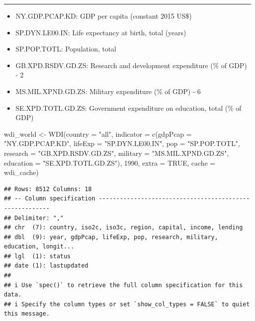 \documentclass[
]{article}
\newenvironment{Shaded}{\begin{snugshade}}{\end{snugshade}}
\newcommand{\AttributeTok}[1]{\textcolor[rgb]{0.77,0.63,0.00}{#1}}
\newcommand{\ConstantTok}[1]{\textcolor[rgb]{0.00,0.00,0.00}{#1}}
\newcommand{\DecValTok}[1]{\textcolor[rgb]{0.00,0.00,0.81}{#1}}
\newcommand{\FunctionTok}[1]{\textcolor[rgb]{0.00,0.00,0.00}{#1}}
\newcommand{\NormalTok}[1]{#1}
\newcommand{\OtherTok}[1]{\textcolor[rgb]{0.56,0.35,0.01}{#1}}
\newcommand{\StringTok}[1]{\textcolor[rgb]{0.31,0.60,0.02}{#1}}
\begin{document}
\begin{center}\rule{0.5\linewidth}{0.5pt}\end{center}

\begin{itemize}
\item
  NY.GDP.PCAP.KD: GDP per capita (constant 2015 US\$)
\item
  SP.DYN.LE00.IN: Life expectancy at birth, total (years)
\item
  SP.POP.TOTL: Population, total
\item
  GB.XPD.RSDV.GD.ZS: Research and development expenditure (\% of GDP) -
  2
\item
  MS.MIL.XPND.GD.ZS: Military expenditure (\% of GDP) - 6
\item
  SE.XPD.TOTL.GD.ZS: Government expenditure on education, total (\% of
  GDP)
\end{itemize}

\begin{Shaded}
\begin{Highlighting}[]
\NormalTok{wdi\_world }\OtherTok{\textless{}{-}} \FunctionTok{WDI}\NormalTok{(}\AttributeTok{country =} \StringTok{"all"}\NormalTok{, }\AttributeTok{indicator =} \FunctionTok{c}\NormalTok{(}\AttributeTok{gdpPcap =} \StringTok{"NY.GDP.PCAP.KD"}\NormalTok{, }\AttributeTok{lifeExp =} \StringTok{"SP.DYN.LE00.IN"}\NormalTok{, }\AttributeTok{pop =} \StringTok{"SP.POP.TOTL"}\NormalTok{, }\AttributeTok{research =} \StringTok{"GB.XPD.RSDV.GD.ZS"}\NormalTok{, }\AttributeTok{military =} \StringTok{"MS.MIL.XPND.GD.ZS"}\NormalTok{, }\AttributeTok{education =} \StringTok{"SE.XPD.TOTL.GD.ZS"}\NormalTok{), }\DecValTok{1990}\NormalTok{, }\AttributeTok{extra =} \ConstantTok{TRUE}\NormalTok{, }\AttributeTok{cache =}\NormalTok{ wdi\_cache)}
\end{Highlighting}
\end{Shaded}

\begin{verbatim}
## Rows: 8512 Columns: 18
## -- Column specification --------------------------------------------------------
## Delimiter: ","
## chr  (7): country, iso2c, iso3c, region, capital, income, lending
## dbl  (9): year, gdpPcap, lifeExp, pop, research, military, education, longit...
## lgl  (1): status
## date (1): lastupdated
## 
## i Use `spec()` to retrieve the full column specification for this data.
## i Specify the column types or set `show_col_types = FALSE` to quiet this message.
\end{verbatim}
\end{document}
